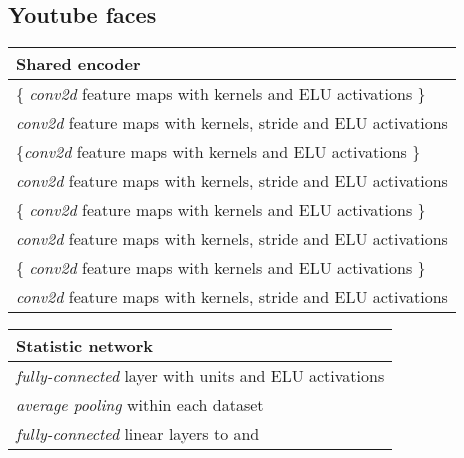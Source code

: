 \documentclass{article} \usepackage{iclr2017_conference,times}
\begin{document}
\subsection{Youtube faces}
\label{appendixb:faces}
\begin{table}[H]

    \begin{tabular}{  l}
    \bf{Shared encoder}  \\ \hline
     \{ \emph{conv2d}  feature maps with  kernels and ELU activations \} \\
    \emph{conv2d}  feature maps with  kernels, stride  and ELU activations \\
    
     \{\emph{conv2d}  feature maps with  kernels and ELU activations \} \\
    \emph{conv2d}  feature maps with  kernels, stride  and ELU activations  \\
    
     \{ \emph{conv2d}  feature maps with  kernels and ELU activations \} \\
    \emph{conv2d}  feature maps with  kernels, stride  and ELU activations \\
    
     \{ \emph{conv2d}  feature maps with  kernels and ELU activations \} \\
    \emph{conv2d}  feature maps with  kernels, stride  and ELU activations
\label{table:faces_common_encoder}
    \end{tabular}
\end{table}
\begin{table}[H]

    \begin{tabular}{  l}
    \bf{Statistic network}  \\ \hline
    \emph{fully-connected} layer with  units and ELU activations \\
    \emph{average pooling} within each dataset\\
    \emph{fully-connected} linear layers to  and 
\label{table:faces_statistic_network}
    \end{tabular}
\end{table}
\end{document}
